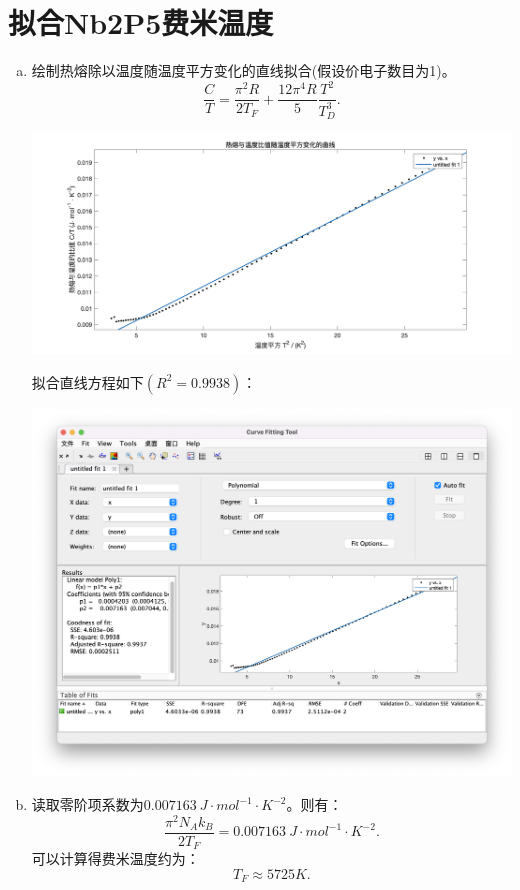 \documentclass[reqno,a4paper,12pt]{amsart}
\begin{document}
\section{\textbf{拟合Nb2P5费米温度}}
\begin{enumerate}[(a)]
	\item 绘制热熔除以温度随温度平方变化的直线拟合(假设价电子数目为1)。
	\[
		\frac{C}{T} = \frac{\pi^2R}{2T_F} + \frac{12\pi^4R}{5}\frac{T^2}{T_D^3}.
	\]
	\begin{center}
		\includegraphics[scale = 0.28]{Nb2P5.png}
	\end{center}
	拟合直线方程如下$(R^2 = 0.9938)$：
	\begin{center}
		\includegraphics[scale = 0.36]{data.png}
	\end{center}

	\item 读取零阶项系数为$0.007163~J \cdot mol^{-1} \cdot K^{-2}$。则有：
	\[
		\frac{\pi^2N_Ak_B}{2T_F} = 0.007163~J \cdot mol^{-1} \cdot K^{-2}.
	\]
	可以计算得费米温度约为：
	\[
		T_F \approx 5725K.
	\]
\end{enumerate}
\end{document}
